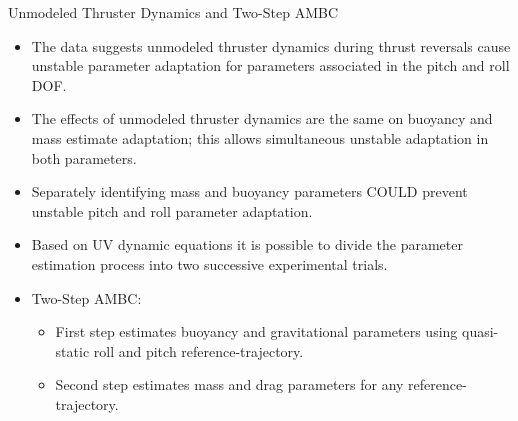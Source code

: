 \begin{frame}{Unmodeled Thruster Dynamics and Two-Step AMBC}

\begin{itemize}
\item<1-> The data suggests unmodeled thruster dynamics during thrust
  reversals cause unstable parameter adaptation for parameters
  associated in the pitch and roll DOF.
\item<2-> The effects of unmodeled thruster dynamics are the same on
  buoyancy and mass estimate adaptation; this allows simultaneous
  unstable adaptation in both parameters.
\item<3-> Separately identifying mass and buoyancy parameters
  \alert<4>{COULD} prevent unstable pitch and roll parameter
  adaptation.
\item<5-> Based on UV dynamic equations it is possible to divide the
  parameter estimation process into two successive experimental trials.
\item<6->\alert<6->{Two-Step AMBC}: 
\begin{itemize}
\item<6-> First step estimates buoyancy and gravitational parameters using
  quasi-static roll and pitch reference-trajectory. 
\item<6-> Second step estimates mass and drag parameters \alert<7->{for
    any reference-trajectory}.
\end{itemize}
\end{itemize}



\end{frame}



